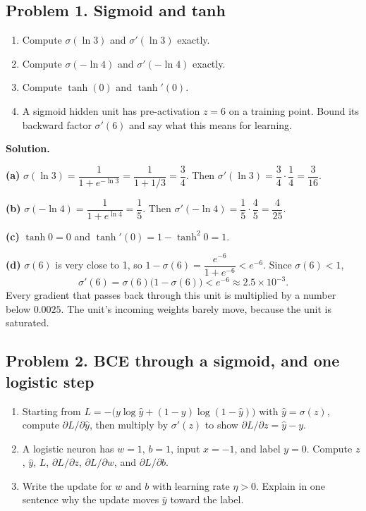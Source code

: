 \subsection*{Problem 1. Sigmoid and tanh}

\begin{enumerate}[label=(\alph*)]
\item Compute $\sigma(\ln 3)$ and $\sigma'(\ln 3)$ exactly.
\item Compute $\sigma(-\ln 4)$ and $\sigma'(-\ln 4)$ exactly.
\item Compute $\tanh(0)$ and $\tanh'(0)$.
\item A sigmoid hidden unit has pre-activation $z = 6$ on a training point. Bound its backward factor $\sigma'(6)$ and say what this means for learning.
\end{enumerate}

\textbf{Solution.}

\textbf{(a)} $\sigma(\ln 3) = \dfrac{1}{1 + e^{-\ln 3}} = \dfrac{1}{1 + 1/3} = \dfrac34$. Then $\sigma'(\ln 3) = \dfrac34\cdot\dfrac14 = \dfrac{3}{16}$.

\textbf{(b)} $\sigma(-\ln 4) = \dfrac{1}{1 + e^{\ln 4}} = \dfrac15$. Then $\sigma'(-\ln 4) = \dfrac15\cdot\dfrac45 = \dfrac{4}{25}$.

\textbf{(c)} $\tanh 0 = 0$ and $\tanh'(0) = 1 - \tanh^2 0 = 1$.

\textbf{(d)} $\sigma(6)$ is very close to 1, so $1 - \sigma(6) = \dfrac{e^{-6}}{1 + e^{-6}} < e^{-6}$. Since $\sigma(6) < 1$,
\[
\sigma'(6) = \sigma(6)\big(1 - \sigma(6)\big) < e^{-6} \approx 2.5\times 10^{-3}.
\]
Every gradient that passes back through this unit is multiplied by a number below $0.0025$. The unit's incoming weights barely move, because the unit is saturated.

\subsection*{Problem 2. BCE through a sigmoid, and one logistic step}

\begin{enumerate}[label=(\alph*)]
\item Starting from $L = -\big(y\log\hat y + (1-y)\log(1-\hat y)\big)$ with $\hat y = \sigma(z)$, compute $\partial L/\partial\hat y$, then multiply by $\sigma'(z)$ to show $\partial L/\partial z = \hat y - y$.
\item A logistic neuron has $w = 1$, $b = 1$, input $x = -1$, and label $y = 0$. Compute $z$, $\hat y$, $L$, $\partial L/\partial z$, $\partial L/\partial w$, and $\partial L/\partial b$.
\item Write the update for $w$ and $b$ with learning rate $\eta > 0$. Explain in one sentence why the update moves $\hat y$ toward the label.
\end{enumerate}

